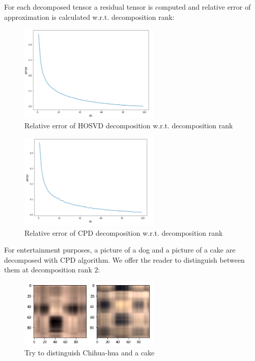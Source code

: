 \documentclass[../../main.tex]{subfiles}
\begin{document}
For each decomposed tensor a residual tensor is computed and relative error of approximation is calculated w.r.t. decomposition rank:


\begin{figure}[h!]
\centering
\includegraphics[width=0.6\textwidth]{figures/HOSVD_err}
\caption{Relative error of HOSVD decomposition w.r.t. decomposition rank}
\label{fig:Lab1:5}
\end{figure}

\begin{figure}[h!]
\centering
\includegraphics[width=0.6\textwidth]{figures/CPD_err}
\caption{Relative error of CPD decomposition w.r.t. decomposition rank}
\label{fig:Lab1:6}
\end{figure}

For entertainment purposes, a picture of a dog and a picture of a cake are decomposed with CPD algorithm. We offer the reader to distinguish between them at decomposition rank $2$:

\begin{figure}[h!]
\centering
\includegraphics[width=0.6\textwidth]{figures/cakedog}
\caption{Try to distinguish Chihua-hua and a cake}
\label{fig:Lab1:7}
\end{figure}
\end{document}
